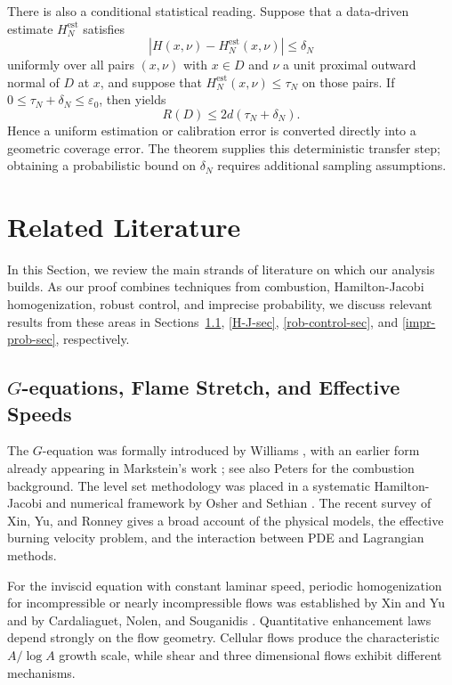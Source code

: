 \documentclass[11pt,reqno,noamsfonts]{amsart}
\theoremstyle{definition}
\theoremstyle{remark}
\begin{document}
There is also a conditional statistical reading. Suppose that a
data-driven estimate $H_N^{\mathrm{est}}$ satisfies
\[
  \left|H(x,\nu)-H_N^{\mathrm{est}}(x,\nu)\right|
  \le \delta_N
\]
uniformly over all pairs $(x,\nu)$ with $x\in D$ and $\nu$ a unit
proximal outward normal of $D$ at $x$, and suppose that
  $H_N^{\mathrm{est}}(x,\nu)\le\tau_N$
on those pairs. If
$0\le\tau_N+\delta_N\le\varepsilon_0$, then
 yields
\[
  R(D)\le2d(\tau_N+\delta_N).
\]
Hence a uniform estimation or calibration error is converted directly
into a geometric coverage error. The theorem supplies this deterministic
transfer step; obtaining a probabilistic bound on $\delta_N$ requires
additional sampling assumptions.

\section{Related Literature}\label{sec:literature}
In this Section, we review the main strands of literature on which our
analysis builds. As our proof combines techniques from combustion,
Hamilton-Jacobi homogenization, robust control, and imprecise
probability, we discuss relevant results from these areas in
Sections~\ref{flame-sec}, \ref{H-J-sec}, \ref{rob-control-sec}, and
\ref{impr-prob-sec}, respectively.


\subsection{$G$-equations, Flame Stretch, and Effective Speeds}\label{flame-sec}
The $G$-equation was formally introduced by Williams
\cite{Williams1985}, with an earlier form already appearing in
Markstein's work \cite{Markstein1964}; see also Peters
\cite{Peters2000} for the combustion background. The level set methodology was placed in a systematic Hamilton-Jacobi
and numerical framework by Osher and Sethian \cite{OsherSethian1988}.  The recent survey of Xin, Yu, and Ronney \cite{XinYuRonney2024} gives a broad account of the physical models, the effective burning velocity problem, and the interaction between PDE and Lagrangian methods.

For the inviscid equation with constant laminar speed, periodic homogenization for incompressible or nearly incompressible flows was established by Xin and Yu \cite{XinYu2010} and by Cardaliaguet, Nolen, and Souganidis \cite{CardaliaguetNolenSouganidis2011}.  Quantitative enhancement laws depend strongly on the flow geometry.  Cellular flows produce the characteristic $A/\log A$ growth scale, while shear and three dimensional flows exhibit different mechanisms.
\end{document}
